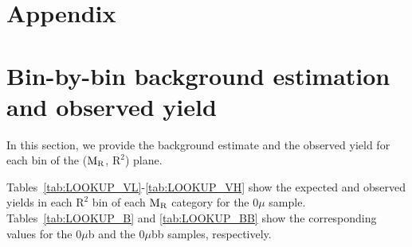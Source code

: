 {{{\section*{Appendix}\label{sec:appendix}


\section{Bin-by-bin background estimation and observed yield}

In this section, we provide the background estimate and the
observed yield for each bin of the ($\mathrm{M_{\rm R}}$, $\mathrm{R}^2$)
plane.
 
Tables~\ref{tab:LOOKUP_VL}-\ref{tab:LOOKUP_VH} show the expected and
observed yields in each $\mathrm{R}^2$ bin of each $\mathrm{M_{\rm R}}$
category for the 0$\mu$ sample.  Tables~\ref{tab:LOOKUP_B} and
\ref{tab:LOOKUP_BB} show the corresponding values for the 0$\mu$b and
the 0$\mu$bb samples, respectively.

}}}
